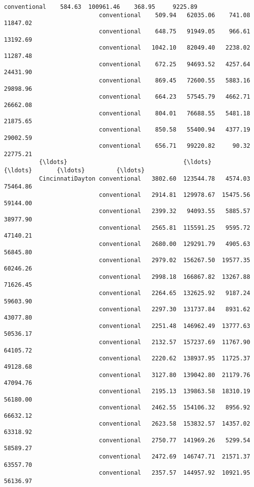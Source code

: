 \documentclass[11pt]{article}
\begin{document}
\begin{Verbatim}[commandchars=\\\{\}]
                           conventional    584.63  100961.46    368.95     9225.89   
                           conventional    509.94   62035.06    741.08    11847.02   
                           conventional    648.75   91949.05    966.61    13192.69   
                           conventional   1042.10   82049.40   2238.02    11287.48   
                           conventional    672.25   94693.52   4257.64    24431.90   
                           conventional    869.45   72600.55   5883.16    29898.96   
                           conventional    664.23   57545.79   4662.71    26662.08   
                           conventional    804.01   76688.55   5481.18    21875.65   
                           conventional    850.58   55400.94   4377.19    29002.59   
                           conventional    656.71   99220.82     90.32    22775.21   
          {\ldots}                                 {\ldots}        {\ldots}       {\ldots}         {\ldots}   
          CincinnatiDayton conventional   3802.60  123544.78   4574.03    75464.86   
                           conventional   2914.81  129978.67  15475.56    59144.00   
                           conventional   2399.32   94093.55   5885.57    38977.90   
                           conventional   2565.81  115591.25   9595.72    47140.21   
                           conventional   2680.00  129291.79   4905.63    56845.80   
                           conventional   2979.02  156267.50  19577.35    60246.26   
                           conventional   2998.18  166867.82  13267.88    71626.45   
                           conventional   2264.65  132625.92   9187.24    59603.90   
                           conventional   2297.30  131737.84   8931.62    43077.80   
                           conventional   2251.48  146962.49  13777.63    50536.17   
                           conventional   2132.57  157237.69  11767.90    64105.72   
                           conventional   2220.62  138937.95  11725.37    49128.68   
                           conventional   3127.80  139042.80  21179.76    47094.76   
                           conventional   2195.13  139863.58  18310.19    56180.00   
                           conventional   2462.55  154106.32   8956.92    66632.12   
                           conventional   2623.58  153832.57  14357.02    63318.92   
                           conventional   2750.77  141969.26   5299.54    58589.27   
                           conventional   2472.69  146747.71  21571.37    63557.70   
                           conventional   2357.57  144957.92  10921.95    56136.97   

\end{Verbatim}
\end{document}
